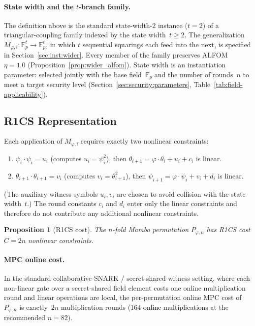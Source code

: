 \documentclass[11pt,a4paper]{article}
\newtheorem{proposition}[theorem]{Proposition}
\theoremstyle{definition}
\newcommand{\Fp}{\mathbb{F}_p}
\begin{document}
\paragraph{State width and the $t$-branch family.}
The definition above is the standard state-width-$2$ instance
($t = 2$) of a triangular-coupling family indexed by the state
width~$t \ge 2$. The generalization $M_{\varphi,i}\colon \Fp^{t} \to
\Fp^{t}$, in which $t$ sequential squarings each feed into the next,
is specified in Section~\ref{sec:inst:wider}. Every member of the
family preserves ALFOM~$\eta = 1.0$
(Proposition~\ref{prop:wider_alfom}). State width is an
instantiation parameter: selected jointly with the base field~$\Fp$
and the number of rounds~$n$ to meet a target security level
(Section~\ref{sec:security:parameters},
Table~\ref{tab:field-applicability}).


\subsection{R1CS Representation}\label{sec:map:r1cs}

Each application of $M_{\varphi,i}$ requires exactly two nonlinear constraints:
\begin{enumerate}[nosep]
  \item $\psi_i \cdot \psi_i = u_i$ (computes $u_i = \psi_i^2$), then
        $\theta_{i+1} = \varphi\cdot\theta_i + u_i + c_i$ is linear.
  \item $\theta_{i+1} \cdot \theta_{i+1} = v_i$ (computes
        $v_i = \theta_{i+1}^2$), then
        $\psi_{i+1} = \varphi\cdot\psi_i + v_i + d_i$ is linear.
\end{enumerate}
(The auxiliary witness symbols $u_i, v_i$ are chosen to avoid
collision with the state width~$t$.)
The round constants $c_i$ and $d_i$ enter only the linear constraints and
therefore do not contribute any additional nonlinear constraints.

\begin{proposition}[R1CS cost]\label{prop:cost}
The $n$-fold Mambo permutation $P_{\varphi,n}$ has R1CS cost $C = 2n$
nonlinear constraints.
\end{proposition}

\paragraph{MPC online cost.}
In the standard collaborative-SNARK / secret-shared-witness setting,
where each non-linear gate over a secret-shared field element costs one
online multiplication round and linear operations are local, the
per-permutation online MPC cost of $P_{\varphi,n}$ is exactly~$2n$
multiplication rounds ($164$ online multiplications at the
recommended $n = 82$).
\end{document}

